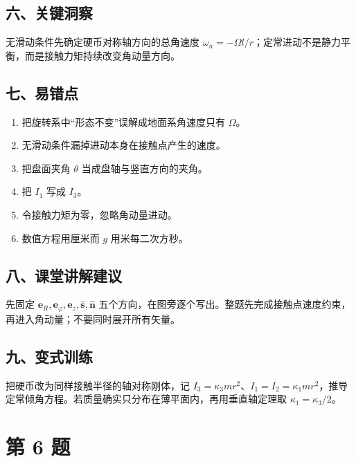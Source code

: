 \documentclass[12pt,a4paper,UTF8]{ctexart}
\newcommand{\tightlist}{\setlength{\itemsep}{0pt}\setlength{\parskip}{0pt}}
\begin{document}
\subsection{六、关键洞察}\label{ux516dux5173ux952eux6d1eux5bdf-4}

无滑动条件先确定硬币对称轴方向的总角速度
\(\omega_n=-\Omega l/r\)；定常进动不是静力平衡，而是接触力矩持续改变角动量方向。

\subsection{七、易错点}\label{ux4e03ux6613ux9519ux70b9-4}

\begin{enumerate}
\def\labelenumi{\arabic{enumi}.}
\tightlist
\item
  把旋转系中``形态不变''误解成地面系角速度只有 \(\Omega\)。
\item
  无滑动条件漏掉进动本身在接触点产生的速度。
\item
  把盘面夹角 \(\theta\) 当成盘轴与竖直方向的夹角。
\item
  把 \(I_1\) 写成 \(I_3\)。
\item
  令接触力矩为零，忽略角动量进动。
\item
  数值方程用厘米而 \(g\) 用米每二次方秒。
\end{enumerate}

\subsection{八、课堂讲解建议}\label{ux516bux8bfeux5802ux8bb2ux89e3ux5efaux8bae-4}

先固定 \(\bm e_R,\bm e_\varphi,\bm e_z,\hat{\bm s},\hat{\bm n}\)
五个方向，在图旁逐个写出。整题先完成接触点速度约束，再进入角动量；不要同时展开所有矢量。

\subsection{九、变式训练}\label{ux4e5dux53d8ux5f0fux8badux7ec3-4}

把硬币改为同样接触半径的轴对称刚体，记
\(I_3=\kappa_3mr^2\)、\(I_1=I_2=\kappa_1mr^2\)，推导定常倾角方程。若质量确实只分布在薄平面内，再用垂直轴定理取
\(\kappa_1=\kappa_3/2\)。

\newpage

\section{第 6 题}\label{ux7b2c-6-ux9898}
\end{document}
